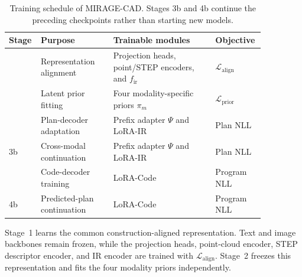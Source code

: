 \documentclass[preprint,12pt]{elsarticle}
\begin{document}
\begin{table}[htbp]
  \centering
  \small
  \caption{Training schedule of MIRAGE-CAD. Stages 3b and 4b continue the
    preceding checkpoints rather than starting new models.}
  \label{tab:training_stages}

  \begin{tabular}{
      >{\raggedright\arraybackslash}p{0.07\linewidth}
      >{\raggedright\arraybackslash}p{0.27\linewidth}
      >{\raggedright\arraybackslash}p{0.38\linewidth}
      >{\raggedright\arraybackslash}p{0.14\linewidth}
    }
    \toprule
    Stage
     & Purpose
     & Trainable modules
     & Objective                                                    \\
    \midrule

    1
     & Representation alignment
     & Projection heads, point/STEP encoders, and $f_{\mathrm{ir}}$
     & $\mathcal{L}_{\mathrm{align}}$                               \\

    2
     & Latent prior fitting
     & Four modality-specific priors $\pi_m$
     & $\mathcal{L}_{\mathrm{prior}}$                               \\

    3
     & Plan-decoder adaptation
     & Prefix adapter $\Psi$ and LoRA-IR
     & Plan NLL                                                     \\

    3b
     & Cross-modal continuation
     & Prefix adapter $\Psi$ and LoRA-IR
     & Plan NLL                                                     \\

    4
     & Code-decoder training
     & LoRA-Code
     & Program NLL                                                  \\

    4b
     & Predicted-plan continuation
     & LoRA-Code
     & Program NLL                                                  \\

    \bottomrule
  \end{tabular}
\end{table}

Stage~1 learns the common construction-aligned representation. Text and image
backbones remain frozen, while the projection heads, point-cloud encoder, STEP
descriptor encoder, and IR encoder are trained with
$\mathcal{L}_{\mathrm{align}}$. Stage~2 freezes this representation and fits
the four modality priors independently.
\end{document}
